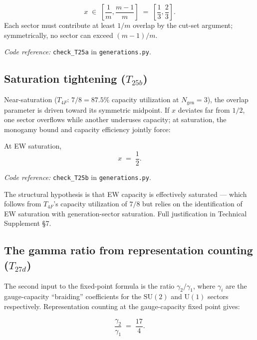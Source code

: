 \documentclass[11pt]{article}
\newcommand{\coderef}[2]{\smallskip\noindent\textit{Code reference:} \texttt{#1} in \texttt{#2}.}
\newcommand{\SU}{\mathrm{SU}}
\newcommand{\Un}{\mathrm{U}}
\newcommand{\epitag}[1]{\textbf{[#1]}}
\theoremstyle{definition}
\begin{document}
\begin{tcolorbox}[apfbox, title={$T_{25a}$ (Interface monogamy bound on $x$) \epitag{P}}]
\[
x \;\in\; \left[\frac{1}{m}, \frac{m-1}{m}\right] \;=\; \left[\frac{1}{3}, \frac{2}{3}\right].
\]
Each sector must contribute at least $1/m$ overlap by the cut-set argument; symmetrically, no sector can exceed $(m-1)/m$.
\end{tcolorbox}

\coderef{check\_T25a}{generations.py}

\subsection{Saturation tightening ($T_{25b}$)}\label{sec:T25b}

Near-saturation ($T_{4F}$: $7/8 = 87.5\%$ capacity utilization at $N_{\mathrm{gen}} = 3$), the overlap parameter is driven toward its symmetric midpoint. If $x$ deviates far from $1/2$, one sector overflows while another underuses capacity; at saturation, the monogamy bound and capacity efficiency jointly force:

\begin{tcolorbox}[apfbox, title={$T_{25b}$ (Saturation tightening) \epitag{P\_structural}}]
At EW saturation,
\[
x \;=\; \frac{1}{2}.
\]
\end{tcolorbox}

\coderef{check\_T25b}{generations.py}

The structural hypothesis is that EW capacity is effectively saturated --- which follows from $T_{4F}$'s capacity utilization of $7/8$ but relies on the identification of EW saturation with generation-sector saturation. Full justification in Technical Supplement \S7.

\subsection{The gamma ratio from representation counting ($T_{27d}$)}\label{sec:T27d}

The second input to the fixed-point formula is the ratio $\gamma_2/\gamma_1$, where $\gamma_i$ are the gauge-capacity ``braiding'' coefficients for the $\SU(2)$ and $\Un(1)$ sectors respectively. Representation counting at the gauge-capacity fixed point gives:

\begin{tcolorbox}[apfbox, title={$T_{27d}$ (Gamma ratio) \epitag{P\_structural}}]
\[
\frac{\gamma_2}{\gamma_1} \;=\; \frac{17}{4}.
\]
\end{tcolorbox}
\end{document}
